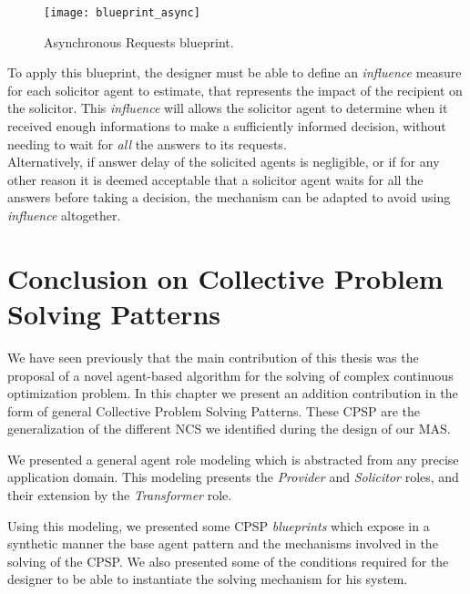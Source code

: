 \begin{figure}
\centering
\texttt{[image: blueprint\_async]}
\caption{Asynchronous Requests blueprint.}\label{blueprint_async}
\end{figure}

To apply this blueprint, the designer must be able to define an \emph{influence} measure for each solicitor agent to estimate, that represents the impact of the recipient on the solicitor. This \emph{influence} will allows the solicitor agent to determine when it received enough informations to make a sufficiently informed decision, without needing to wait for \emph{all} the answers to its requests.\\
Alternatively, if answer delay of the solicited agents is negligible, or if for any other reason it is deemed acceptable that a solicitor agent waits for all the answers before taking a decision, the mechanism can be adapted to avoid using \emph{influence} altogether.

\section{Conclusion on Collective Problem Solving Patterns}

We have seen previously that the main contribution of this thesis was the proposal of a novel agent-based algorithm for the solving of complex continuous optimization problem. In this chapter we present an addition contribution in the form of general Collective Problem Solving Patterns. These CPSP are the generalization of the different NCS we identified during the design of our MAS.

We presented a general agent role modeling which is abstracted from any precise application domain. This modeling presents the \emph{Provider} and \emph{Solicitor} roles, and their extension by the \emph{Transformer} role.

Using this modeling, we presented some CPSP \emph{blueprints} which expose in a synthetic manner the base agent pattern and the mechanisms involved in the solving of the CPSP. We also presented some of the conditions required for the designer to be able to instantiate the solving mechanism for his system.

